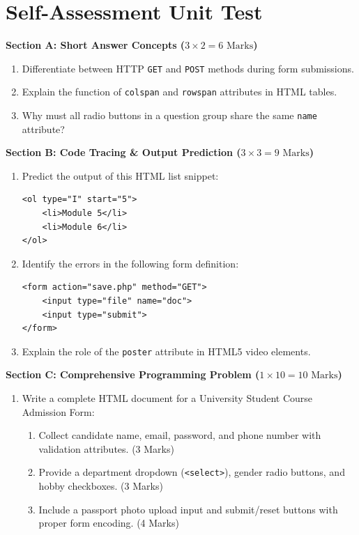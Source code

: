 \section{Self-Assessment Unit Test}

\begin{chaptertest}
\noindent\textbf{Section A: Short Answer Concepts ($3 \times 2 = 6\text{ Marks}$)}
\begin{enumerate}
    \item Differentiate between HTTP \texttt{GET} and \texttt{POST} methods during form submissions.
    \item Explain the function of \texttt{colspan} and \texttt{rowspan} attributes in HTML tables.
    \item Why must all radio buttons in a question group share the same \texttt{name} attribute?
\end{enumerate}

\medskip
\noindent\textbf{Section B: Code Tracing \& Output Prediction ($3 \times 3 = 9\text{ Marks}$)}
\begin{enumerate}[start=4]
    \item Predict the output of this HTML list snippet:
    \begin{lstlisting}[language=HTML5]
<ol type="I" start="5">
    <li>Module 5</li>
    <li>Module 6</li>
</ol>
    \end{lstlisting}
    \item Identify the errors in the following form definition:
    \begin{lstlisting}[language=HTML5]
<form action="save.php" method="GET">
    <input type="file" name="doc">
    <input type="submit">
</form>
    \end{lstlisting}
    \item Explain the role of the \texttt{poster} attribute in HTML5 video elements.
\end{enumerate}

\medskip
\noindent\textbf{Section C: Comprehensive Programming Problem ($1 \times 10 = 10\text{ Marks}$)}
\begin{enumerate}[start=7]
    \item Write a complete HTML document for a University Student Course Admission Form:
    \begin{enumerate}[label=(\alph*)]
        \item Collect candidate name, email, password, and phone number with validation attributes. (3 Marks)
        \item Provide a department dropdown (\texttt{<select>}), gender radio buttons, and hobby checkboxes. (3 Marks)
        \item Include a passport photo upload input and submit/reset buttons with proper form encoding. (4 Marks)
    \end{enumerate}
\end{enumerate}
\end{chaptertest}


